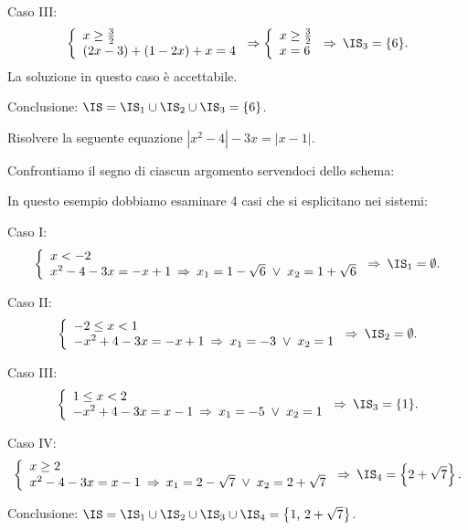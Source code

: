 \begin{exrig}
\begin{esempio}
Caso III: 
\[\left\{\begin{array}{l}x\ge\frac 3 2\\(2x-3)+(1-2x)+x=4\end{array}\right.\Rightarrow \left\{\begin{array}{l}x\ge\frac 3 2\\x=6\end{array}\right.\Rightarrow\: \IS_3=\{6\}.\]
La soluzione in questo caso è accettabile.

Conclusione: $\IS=\IS_1\cup \IS_2\cup \IS_3=\{6\}$.
\end{esempio}

\begin{esempio}
Risolvere la seguente equazione $\left|x^2-4\right|-3x=\left|x-1\right|$.

Confrontiamo il segno di ciascun argomento servendoci dello schema:
\begin{center}

\end{center}
In questo esempio dobbiamo esaminare 4 casi che si esplicitano nei sistemi:
\begin{itemize*}
\item Caso I: 
\[\left\{\begin{array}{l}{x< -2}\\{x^2-4-3x=-x+1}\:\Rightarrow\: x_1=1-\sqrt 6\;\vee\; x_2=1+\sqrt 6\end{array}\right.\Rightarrow\: \IS_1=\emptyset .\]
\item Caso II: 
\[\left\{\begin{array}{l}{-2\le x<1}\\{-x^2+4-3x=-x+1}\:\Rightarrow\: x_1=-3\;\vee\; x_2=1\end{array}\right.\Rightarrow\: \IS_2=\emptyset .\]
\item Caso III: 
\[\left\{\begin{array}{l}{1\le x<2}\\{-x^2+4-3x=x-1}\:\Rightarrow\: x_1=-5\;\vee\; x_2=1\end{array}\right.\Rightarrow\: \IS_3=\{1\}.\]
\item Caso IV: 
\[\left\{\begin{array}{l}{x\ge 2}\\{x^2-4-3x=x-1}\:\Rightarrow\: x_1=2-\sqrt 7\;\vee\; x_2=2+\sqrt 7\end{array}\right.\Rightarrow\: \IS_4=\left\{2+\sqrt 7\right\}.\]
\end{itemize*}

Conclusione: $\IS=\IS_1\cup \IS_2\cup \IS_3\cup \IS_4=\left\{1\text{, }2+\sqrt 7\right\}$.
\end{esempio}
\end{exrig}

